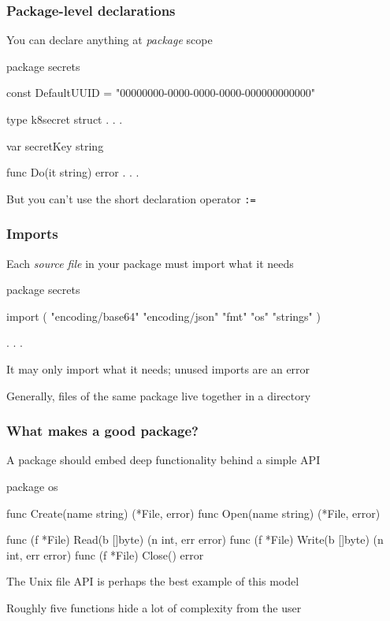 \documentclass[handout,compress,t,11pt]{beamer}
\begin{document}
\begin{frame}[fragile]
\frametitle{Package-level declarations}
You can declare anything at {\em package} scope
\begin{golang}
package secrets

const DefaultUUID = "00000000-0000-0000-0000-000000000000"

type k8secret struct {
    . . .
}

var secretKey string

func Do(it string) error {
   . . .
}
\end{golang}
\vspace{0.6\baselineskip}
But you can't use the short declaration operator \verb|:=| \par
\end{frame}

\begin{frame}[fragile]
\frametitle{Imports}
Each {\em source file} in your package must import what it needs
\begin{golang}
package secrets

import (
	"encoding/base64"
	"encoding/json"
	"fmt"
	"os"
	"strings"
)

. . .
\end{golang}
\vspace{0.6\baselineskip}
It may only import what it needs; unused imports are an error \par
\vspace{0.4\baselineskip}
Generally, files of the same package live together in a directory
\end{frame}

\begin{frame}[fragile]
\frametitle{What makes a good package?}
A package should embed deep functionality behind a simple API
\begin{golang}
package os

func Create(name string) (*File, error)
func Open(name string) (*File, error)

func (f *File) Read(b []byte) (n int, err error)
func (f *File) Write(b []byte) (n int, err error)
func (f *File) Close() error
\end{golang}
\vspace{2\baselineskip}
The Unix file API is perhaps the best example of this model \par
\vspace{0.5\baselineskip}
Roughly five functions hide a lot of complexity from the user
\end{frame}
\end{document}
